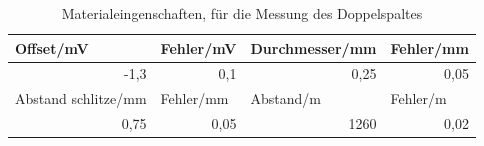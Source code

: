 \documentclass[12pt]{scrartcl}
\begin{document}
\begin{table}[H]
\caption{Materialeingenschaften, für die Messung des Doppelspaltes}
\begin{center}
\begin{tabular}{|l|l|l|l|}
\hline
Offset/mV & Fehler/mV & Durchmesser/mm & Fehler/mm \\ \hline
\multicolumn{1}{|r|}{-1,3} & \multicolumn{1}{|r|}{0,1} & \multicolumn{1}{r|}{0,25} & \multicolumn{1}{r|}{0,05} \\ \hline
Abstand schlitze/mm & Fehler/mm & Abstand/m & Fehler/m \\ \hline
\multicolumn{1}{|r|}{0,75} & \multicolumn{1}{r|}{0,05} & \multicolumn{1}{r|}{1260} & \multicolumn{1}{r|}{0,02} \\ \hline
\end{tabular}
\end{center}
\label{tab:a_3_e}
\end{table}
\end{document}
